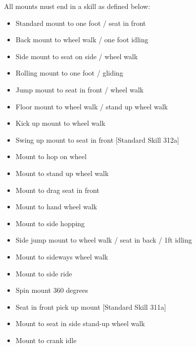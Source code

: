 All mounts must end in a skill as defined below:
\begin{multicols}{2}
\begin{itemize}
\item Standard mount to one foot / seat in front
\item Back mount to wheel walk / one foot idling
\item Side mount to seat on side / wheel walk
\item Rolling mount to one foot / gliding
\item Jump mount to seat in front / wheel walk
\item Floor mount to wheel walk / stand up wheel walk
\item Kick up mount to wheel walk
\item Swing up mount to seat in front [Standard Skill 312a]
\item Mount to hop on wheel
\item Mount to stand up wheel walk
\item Mount to drag seat in front
\item Mount to hand wheel walk
\item Mount to side hopping
\item Side jump mount to wheel walk / seat in back / 1ft idling
\item Mount to sideways wheel walk
\item Mount to side ride
\item Spin mount 360 degrees
\item Seat in front pick up mount [Standard Skill 311a]
\item Mount to seat in side stand-up wheel walk
\item Mount to crank idle
\end{itemize}
\end{multicols}

